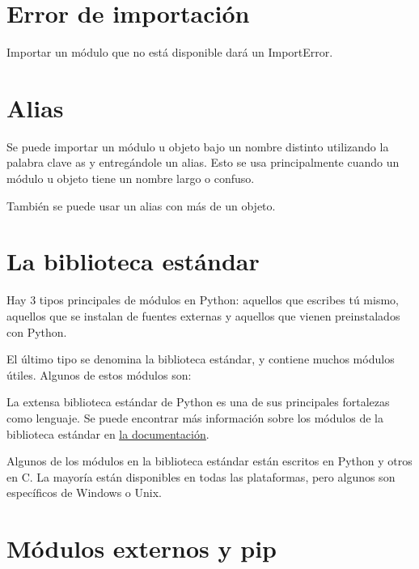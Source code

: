 \documentclass{report}
\begin{document}

\section{Error de importación}

Importar un módulo que no está disponible dará un ImportError.


\section{Alias}

Se puede importar un módulo u objeto bajo un nombre distinto utilizando la palabra clave as y entregándole un alias. Esto se usa principalmente cuando un módulo u objeto tiene un nombre largo o confuso.


También se puede usar un alias con más de un objeto.


\section{La biblioteca estándar}

Hay 3 tipos principales de módulos en Python: aquellos que escribes tú mismo, aquellos que se instalan de fuentes externas y aquellos que vienen preinstalados con Python.

El último tipo se denomina la biblioteca estándar, y contiene muchos módulos útiles. Algunos de estos módulos son:


La extensa biblioteca estándar de Python es una de sus principales fortalezas como lenguaje. Se puede encontrar más información sobre los módulos de la biblioteca estándar en \href{https://docs.python.org/3/library/index.html}{\underline{la documentación}}.

Algunos de los módulos en la biblioteca estándar están escritos en Python y otros en C. La mayoría están disponibles en todas las plataformas, pero algunos son específicos de Windows o Unix.

\section{Módulos externos y pip}
\end{document}
